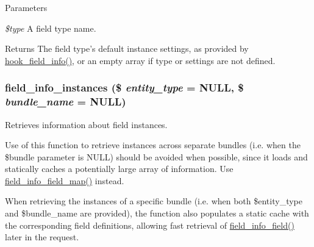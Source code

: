 \begin{DoxyParams}{Parameters}
\item[{\em \$type}]A field type name.\end{DoxyParams}
\begin{DoxyReturn}{Returns}
The field type's default instance settings, as provided by \hyperlink{group__field__types_gad3eb779f26f41b520f19af011ece3eb1}{hook\_\-field\_\-info()}, or an empty array if type or settings are not defined. 
\end{DoxyReturn}
\hypertarget{group__field__info_ga6881d157e9e37472626dbefe406032f4}{
\subsubsection[{field\_\-info\_\-instances}]{\setlength{\rightskip}{0pt plus 5cm}field\_\-info\_\-instances (\$ {\em entity\_\-type} = {\ttfamily NULL}, \/  \$ {\em bundle\_\-name} = {\ttfamily NULL})}}
\label{group__field__info_ga6881d157e9e37472626dbefe406032f4}
Retrieves information about field instances.

Use of this function to retrieve instances across separate bundles (i.e. when the \$bundle parameter is NULL) should be avoided when possible, since it loads and statically caches a potentially large array of information. Use \hyperlink{group__field__info_gacb01ef76f6e24f61dbd2ae56c44f7eee}{field\_\-info\_\-field\_\-map()} instead.

When retrieving the instances of a specific bundle (i.e. when both \$entity\_\-type and \$bundle\_\-name are provided), the function also populates a static cache with the corresponding field definitions, allowing fast retrieval of \hyperlink{group__field__info_ga74cfc942cd2baa5c49780b08c5d357d4}{field\_\-info\_\-field()} later in the request.


